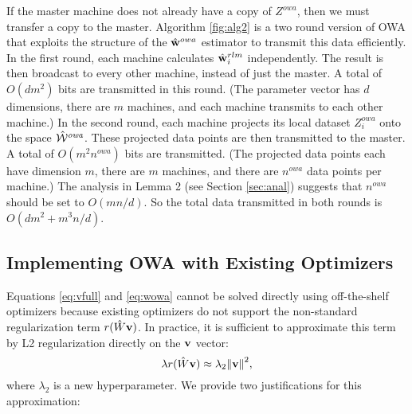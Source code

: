 \documentclass[thesis.tex]{subfiles}
\newcommand{\Zowa}{Z^{\textit{owa}}}
\newcommand{\nowa}{n^{\textit{owa}}}
\begin{document}
If the master machine does not already have a copy of $\Zowa$,
then we must transfer a copy to the master. 
Algorithm \ref{fig:alg2} is a two round version of OWA that exploits the structure of the $\hat{\mathbf w}^{owa}$ estimator to transmit this data efficiently.
In the first round, each machine calculates $\hat{\mathbf w}^{rlm}_i$ independently.
The result is then broadcast to every other machine, instead of just the master.
A total of $O(dm^2)$ bits are transmitted in this round.
(The parameter vector has $d$ dimensions,
there are $m$ machines,
and each machine transmits to each other machine.)
In the second round, each machine projects its local dataset $\Zowa_i$ onto the space ${\hat {{\mathcal W}}^{\textit{owa}}}$.
These projected data points are then transmitted to the master.
A total of $O(m^2\nowa)$ bits are transmitted.
(The projected data points each have dimension $m$, 
there are $m$ machines,
and there are $\nowa$ data points per machine.)
The analysis in Lemma 2 (see Section \ref{sec:anal}) suggests that $\nowa$ should be set to $O(mn/d)$.
So the total data transmitted in both rounds is $O(dm^2 + m^3n/d)$. 

%

\subsection{Implementing OWA with Existing Optimizers}
\label{sec:lambda2}

Equations \ref{eq:vfull} and \ref{eq:wowa} cannot be solved directly using off-the-shelf optimizers because existing optimizers do not support the non-standard regularization term $r(\hat W\mathbf{v})$.
In practice, it is sufficient to approximate this term by L2 regularization directly on the $\mathbf{v}$ vector:
\begin{equation}
\lambda r(\hat W\mathbf{v}) \approx \lambda_2 {\lVert {\mathbf{v}} \rVert}^2
,
\label{eq:approxreg}
\end{equation}
where $\lambda_2$ is a new hyperparameter.
We provide two justifications for this approximation:
\end{document}
